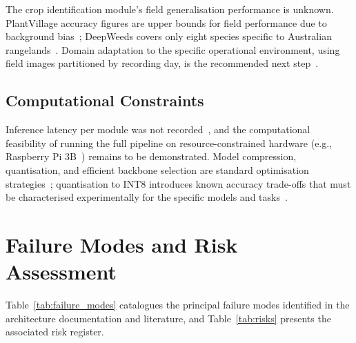 \documentclass[12pt, a4paper]{article}
\begin{document}
The crop identification module's field generalisation performance is unknown. PlantVillage
accuracy figures are upper bounds for field performance due to background
bias~\cite{ref154, ref203, ref204}; DeepWeeds covers only eight species specific to
Australian rangelands~\cite{ref167, ref213}. Domain adaptation to the specific operational
environment, using field images partitioned by recording day, is the recommended next
step~\cite{ref154, ref208}.

\subsection{Computational Constraints}

Inference latency per module was not recorded~\cite{ref234}, and the computational
feasibility of running the full pipeline on resource-constrained hardware (e.g., Raspberry
Pi 3B~\cite{ref1}) remains to be demonstrated. Model compression, quantisation, and
efficient backbone selection are standard optimisation strategies~\cite{ref182, ref183};
quantisation to INT8 introduces known accuracy trade-offs that must be characterised
experimentally for the specific models and tasks~\cite{ref68, ref71}.

\section{Failure Modes and Risk Assessment}

Table~\ref{tab:failure_modes} catalogues the principal failure modes identified in the
architecture documentation and literature, and Table~\ref{tab:risks} presents the
associated risk register.
\end{document}
